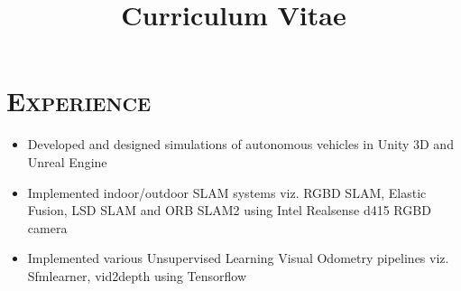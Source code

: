 \documentclass[11pt,a4paper,roman]{moderncv} %
\title{\Large{Curriculum Vitae}}
\begin{document}
\begin{comment}


\clearpage

\recipient{HR Department}{Corporation\\123 Pleasant Lane\\12345 City, State} %
\date{\today} %
\opening{Dear Sir or Madam,} %
\closing{Sincerely yours,} %
\enclosure[Attached]{curriculum vit\ae{}} %

\makelettertitle %

\lipsum[1-2] %
\lipsum[4] %

\makeletterclosing %

\newpage
\end{comment}


\makecvtitle %


\section{\scshape{Experience}}

{
\begin{itemize}
\item Developed and designed simulations of autonomous vehicles in Unity 3D and Unreal
    Engine
\item Implemented indoor/outdoor SLAM systems viz. RGBD SLAM, Elastic Fusion, 
LSD SLAM and ORB SLAM2 using Intel Realsense d415 RGBD camera    
\item Implemented various Unsupervised Learning Visual Odometry pipelines viz. Sfmlearner, vid2depth using Tensorflow
\newline{}
\end{itemize}}
\end{document}
